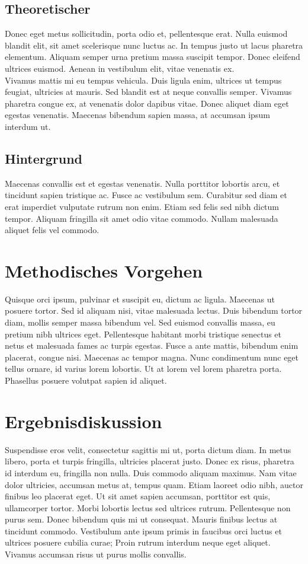 \subsection{Theoretischer}
Donec eget metus sollicitudin, porta odio et, pellentesque erat. Nulla euismod blandit elit, sit amet scelerisque nunc luctus ac. In tempus justo ut lacus pharetra elementum. Aliquam semper urna pretium massa suscipit tempor. Donec eleifend ultrices euismod. Aenean in vestibulum elit, vitae venenatis ex.\\
Vivamus mattis mi eu tempus vehicula. Duis ligula enim, ultrices ut tempus feugiat, ultricies at mauris. Sed blandit est at neque convallis semper. Vivamus pharetra congue ex, at venenatis dolor dapibus vitae. Donec aliquet diam eget egestas venenatis. Maecenas bibendum sapien massa, at accumsan ipsum interdum ut.

\subsection{Hintergrund}
Maecenas convallis est et egestas venenatis. Nulla porttitor lobortis arcu, et tincidunt sapien tristique ac. Fusce ac vestibulum sem. Curabitur sed diam et erat imperdiet vulputate rutrum non enim. Etiam sed felis sed nibh dictum tempor. Aliquam fringilla sit amet odio vitae commodo. Nullam malesuada aliquet felis vel commodo.

\section{Methodisches Vorgehen}
Quisque orci ipsum, pulvinar et suscipit eu, dictum ac ligula. Maecenas ut posuere tortor. Sed id aliquam nisi, vitae malesuada lectus. Duis bibendum tortor diam, mollis semper massa bibendum vel. Sed euismod convallis massa, eu pretium nibh ultrices eget. Pellentesque habitant morbi tristique senectus et netus et malesuada fames ac turpis egestas. Fusce a ante mattis, bibendum enim placerat, congue nisi. Maecenas ac tempor magna. Nunc condimentum nunc eget tellus ornare, id varius lorem lobortis. Ut at lorem vel lorem pharetra porta. Phasellus posuere volutpat sapien id aliquet.

\section{Ergebnisdiskussion}
Suspendisse eros velit, consectetur sagittis mi ut, porta dictum diam. In metus libero, porta et turpis fringilla, ultricies placerat justo. Donec ex risus, pharetra id interdum eu, fringilla non nulla. Duis commodo aliquam maximus. Nam vitae dolor ultricies, accumsan metus at, tempus quam. Etiam laoreet odio nibh, auctor finibus leo placerat eget. Ut sit amet sapien accumsan, porttitor est quis, ullamcorper tortor. Morbi lobortis lectus sed ultrices rutrum. Pellentesque non purus sem. Donec bibendum quis mi ut consequat. Mauris finibus lectus at tincidunt commodo. Vestibulum ante ipsum primis in faucibus orci luctus et ultrices posuere cubilia curae; Proin rutrum interdum neque eget aliquet. Vivamus accumsan risus ut purus mollis convallis.

